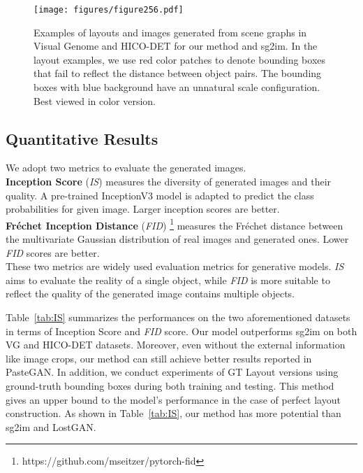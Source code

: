 \begin{figure*}[!t]
\centering
\texttt{[image: figures/figure256.pdf]}
\caption{Examples of layouts and images generated from scene graphs in Visual Genome and HICO-DET for our method and sg2im. In the layout examples, we use red color patches to denote bounding boxes that fail to reflect the distance between object pairs. The bounding boxes with blue background have an unnatural scale configuration. Best viewed in color version.}
\label{fig:cmp}
\end{figure*}

\subsection{Quantitative Results}

We adopt two metrics to evaluate the generated images. \\\textbf{Inception Score} (\textit{IS}) \cite{salimans2016improved} measures the diversity of generated images and their quality. A pre-trained InceptionV3 model is adapted to predict the class probabilities for given image. Larger inception scores are better.\\\textbf{Fréchet Inception Distance} (\textit{FID}) \cite{heusel2017gans}\footnote{https://github.com/mseitzer/pytorch-fid} measures the Fréchet distance between the multivariate Gaussian distribution of real images and generated ones. Lower \textit{FID} scores are better.\\
These two metrics are widely used evaluation metrics for generative models. \textit{IS} aims to evaluate the reality of a single object, while \textit{FID} is more suitable to reflect the quality of the generated image contains multiple objects.

Table~\ref{tab:IS} summarizes the performances on the two aforementioned datasets in terms of Inception Score and \textit{FID} score. Our model outperforms sg2im on both VG and HICO-DET datasets. 
Moreover, even without the external information like image crops, our method can still achieve better results reported in PasteGAN. 
In addition, we conduct experiments of GT Layout versions using ground-truth bounding boxes during both training and testing. This method gives an upper bound to the model's performance in the case of perfect layout construction. As shown in Table~\ref{tab:IS}, our method has more potential than sg2im and LostGAN.

